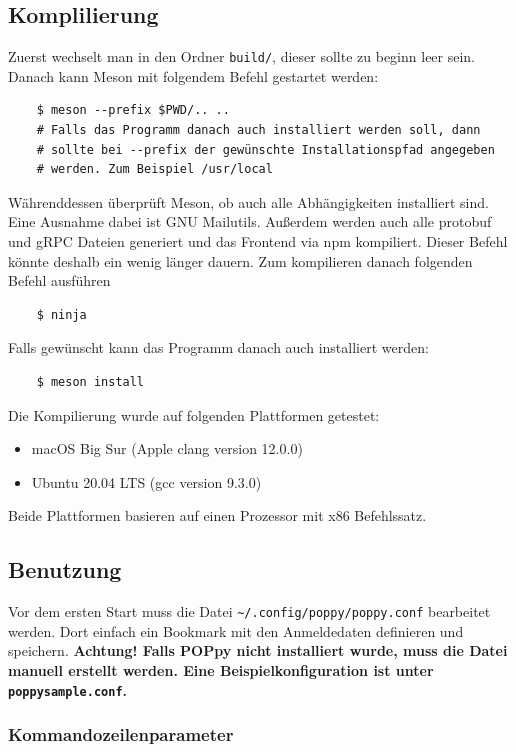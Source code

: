 \documentclass[12pt]{article}
\def\code#1{\texttt{#1}}
\begin{document}
\subsection{Komplilierung}
Zuerst wechselt man in den Ordner \code{build/}, dieser sollte zu beginn leer
sein. Danach kann Meson mit folgendem Befehl gestartet werden:
\begin{verbatim}
    $ meson --prefix $PWD/.. ..
    # Falls das Programm danach auch installiert werden soll, dann 
    # sollte bei --prefix der gewünschte Installationspfad angegeben 
    # werden. Zum Beispiel /usr/local
\end{verbatim}
Währenddessen überprüft Meson, ob auch alle Abhängigkeiten installiert sind.
Eine Ausnahme dabei ist GNU Mailutils. Außerdem werden auch alle protobuf und
gRPC Dateien generiert und das Frontend via npm kompiliert. Dieser Befehl
könnte deshalb ein wenig länger dauern. \newline
Zum kompilieren danach folgenden Befehl ausführen
\begin{verbatim}
    $ ninja
\end{verbatim}
Falls gewünscht kann das Programm danach auch installiert werden:
\begin{verbatim}
    $ meson install
\end{verbatim}
Die Kompilierung wurde auf folgenden Plattformen getestet:
\begin{itemize}
    \item macOS Big Sur (Apple clang version 12.0.0)
    \item Ubuntu 20.04 LTS (gcc version 9.3.0)
\end{itemize}
Beide Plattformen basieren auf einen Prozessor mit x86 Befehlssatz.

\subsection{Benutzung}
Vor dem ersten Start muss die Datei 
\code{\textasciitilde /.config/poppy/poppy.conf} bearbeitet werden. Dort 
einfach ein Bookmark mit den Anmeldedaten definieren und speichern. 
\newline
\newline
\textbf{Achtung! Falls POPpy nicht installiert wurde, muss die Datei 
manuell erstellt werden. Eine Beispielkonfiguration ist unter 
\code{poppy\textunderscore sample.conf}.}

\subsubsection{Kommandozeilenparameter}
\end{document}
